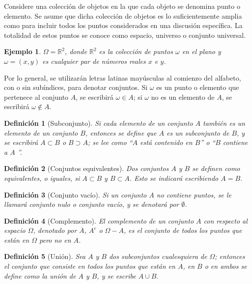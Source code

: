 \documentclass[12pt]{article}
\newtheorem*{example}{Ejemplo}
\newtheorem{definition}{Definición}
\begin{document}
Considere una colección de objetos en la que cada objeto se denomina punto o elemento. Se asume que dicha colección de objetos es lo suficientemente amplia como para incluir todos los puntos considerados en una discusión específica. La totalidad de estos puntos se conoce como espacio, universo o conjunto universal.
\begin{example}
     $\Omega = \mathbb{R}^2$, donde $\mathbb{R}^2$ es la colección de puntos $\omega$ en el plano y $\omega=(x,y)$ es cualquier par de números reales $x$ e $y$.
\end{example}
Por lo general, se utilizarán letras latinas mayúsculas al comienzo del alfabeto, con o sin subíndices, para denotar conjuntos. Si $\omega$ es un punto o elemento que pertenece al conjunto $A$, se escribirá $\omega \in A$; si $\omega$ no es un elemento de $A$, se escribirá $\omega \notin A$.

\begin{definition}[Subconjunto]
    Si cada elemento de un conjunto $A$ también es un elemento de un conjunto $B$, entonces se define que $A$ es un subconjunto de $B$, y se escribirá $A\subset B$ o $B\supset A$; se lee como ``$A$ está contenido en $B$'' o ``$B$ contiene a $A$ ''.
\end{definition}

\begin{definition}[Conjuntos equivalentes]
    Dos conjuntos $A$ y $B$ se definen como equivalentes, o iguales, si $A\subset B$ y $B\subset A$. Esto se indicará escribiendo $A=B$.
\end{definition}

\begin{definition}[Conjunto vacío]
     Si un conjunto $A$ no contiene puntos, se le llamará conjunto nulo o conjunto vacío, y se denotará por $\emptyset$.
\end{definition}

\begin{definition}[Complemento]
    El complemento de un conjunto $A$ con respecto al espacio $\Omega$, denotado por $\overline{A}$, $A^c$ o $\Omega-A$, es el conjunto de todos los puntos que están en $\Omega$ pero no en $A$.
\end{definition}

\begin{definition}[Unión]
    Sea $A$ y $B$ dos subconjuntos cualesquiera de $\Omega$; entonces el conjunto que consiste en todos los puntos que están en $A$, en $B$ o en ambos se define como la unión de $A$ y $B$, y se escribe $A \cup B$.
\end{definition}
\end{document}
